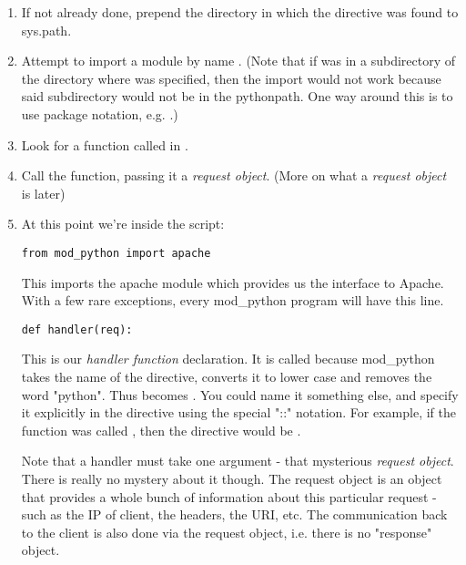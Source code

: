 \begin{enumerate}

\item
If not already done, prepend the directory in which the
 directive was found to sys.path.

\item
Attempt to import a module by name . (Note that if
 was in a subdirectory of the directory where
 was specified, then the import would not work
because said subdirectory would not be in the pythonpath. One way
around this is to use package notation, e.g. .)

\item 
Look for a function called  in .

\item
Call the function, passing it a \emph{request object}. (More on what a
\emph{request object} is later)

\item
At this point we're inside the script: 


\begin{verbatim}
from mod_python import apache
\end{verbatim}
This imports the apache module which provides us the interface to
Apache. With a few rare exceptions, every mod_python program will have
this line.

\begin{verbatim}
def handler(req):
\end{verbatim}
This is our \emph{handler function} declaration. It is called 
because mod_python takes the name of the directive, converts it to
lower case and removes the word "python". Thus  becomes
. You could name it something else, and specify it explicitly
in the directive using the special "::" notation. For example, if the
function was called , then the directive would be
.


Note that a handler must take one argument - that mysterious \emph{request
object}. There is really no mystery about it though.  The request
object is an object that provides a whole bunch of information about
this particular request - such as the IP of client, the headers, the
URI, etc. The communication back to the client is also done via the
request object, i.e. there is no "response" object.



\end{enumerate}
